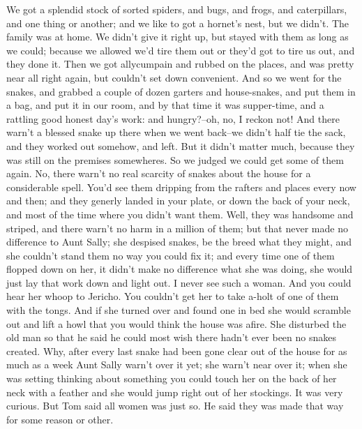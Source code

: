 We got a splendid stock of sorted spiders, and bugs, and frogs, and
caterpillars, and one thing or another; and we like to got a hornet's
nest, but we didn't.  The family was at home.  We didn't give it right
up, but stayed with them as long as we could; because we allowed we'd
tire them out or they'd got to tire us out, and they done it.  Then we
got allycumpain and rubbed on the places, and was pretty near all right
again, but couldn't set down convenient.  And so we went for the snakes,
and grabbed a couple of dozen garters and house-snakes, and put them in a
bag, and put it in our room, and by that time it was supper-time, and a
rattling good honest day's work:  and hungry?--oh, no, I reckon not!  And
there warn't a blessed snake up there when we went back--we didn't half
tie the sack, and they worked out somehow, and left.  But it didn't
matter much, because they was still on the premises somewheres.  So we
judged we could get some of them again.  No, there warn't no real
scarcity of snakes about the house for a considerable spell.  You'd see
them dripping from the rafters and places every now and then; and they
generly landed in your plate, or down the back of your neck, and most of
the time where you didn't want them.  Well, they was handsome and
striped, and there warn't no harm in a million of them; but that never
made no difference to Aunt Sally; she despised snakes, be the breed what
they might, and she couldn't stand them no way you could fix it; and
every time one of them flopped down on her, it didn't make no difference
what she was doing, she would just lay that work down and light out.  I
never see such a woman.  And you could hear her whoop to Jericho.  You
couldn't get her to take a-holt of one of them with the tongs.  And if
she turned over and found one in bed she would scramble out and lift a
howl that you would think the house was afire.  She disturbed the old man
so that he said he could most wish there hadn't ever been no snakes
created.  Why, after every last snake had been gone clear out of the
house for as much as a week Aunt Sally warn't over it yet; she warn't
near over it; when she was setting thinking about something you could
touch her on the back of her neck with a feather and she would jump right
out of her stockings.  It was very curious.  But Tom said all women was
just so.  He said they was made that way for some reason or other.

